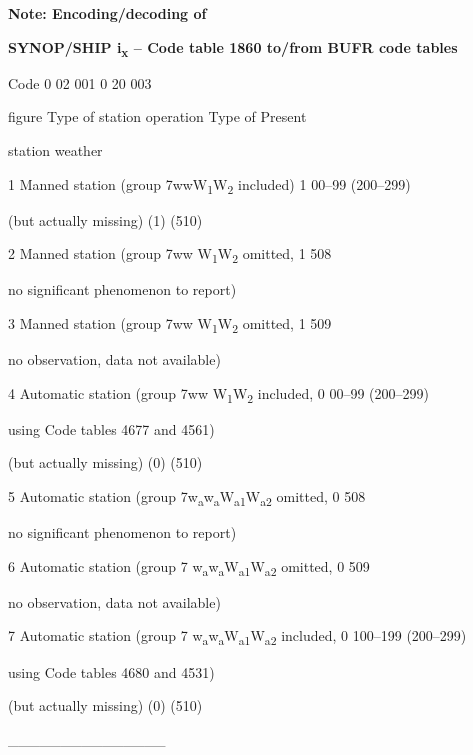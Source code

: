 \textbf{Note: Encoding/decoding of}

\textbf{SYNOP/SHIP i\textsubscript{x} -- Code table 1860 to/from BUFR code tables}

Code 0 02 001 0 20 003

figure Type of station operation Type of Present

station weather

1 Manned station (group 7wwW\textsubscript{1}W\textsubscript{2} included) 1 00--99 (200--299)

(but actually missing) (1) (510)

2 Manned station (group 7ww W\textsubscript{1}W\textsubscript{2} omitted, 1 508

no significant phenomenon to report)

3 Manned station (group 7ww W\textsubscript{1}W\textsubscript{2} omitted, 1 509

no observation, data not available)

4 Automatic station (group 7ww W\textsubscript{1}W\textsubscript{2} included, 0 00--99 (200--299)

using Code tables 4677 and 4561)

(but actually missing) (0) (510)

5 Automatic station (group 7w\textsubscript{a}w\textsubscript{a}W\textsubscript{a1}W\textsubscript{a2} omitted, 0 508

no significant phenomenon to report)

6 Automatic station (group 7 w\textsubscript{a}w\textsubscript{a}W\textsubscript{a1}W\textsubscript{a2} omitted, 0 509

no observation, data not available)

7 Automatic station (group 7 w\textsubscript{a}w\textsubscript{a}W\textsubscript{a1}W\textsubscript{a2} included, 0 100--199 (200--299)

using Code tables 4680 and 4531)

(but actually missing) (0) (510)

\_\_\_\_\_\_\_\_\_\_\_\_\_\_\_
